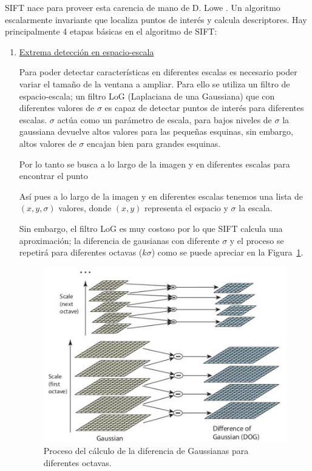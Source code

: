 SIFT nace para proveer esta carencia de mano de D. Lowe \parencite{Reference10}. Un algoritmo escalarmente invariante que  localiza puntos de interés y calcula descriptores. Hay principalmente 4 etapas básicas en el algoritmo de SIFT:

\begin{enumerate}
\item \underline{Extrema detección en espacio-escala}

Para poder detectar características en diferentes escalas es necesario poder variar el tamaño de la ventana a ampliar. Para ello se utiliza un filtro de espacio-escala; un filtro LoG (Laplaciana de una Gaussiana) que con diferentes valores de $\sigma$ es capaz de detectar puntos de interés para diferentes escalas. $\sigma$ actúa como un parámetro de escala, para bajos niveles de $\sigma$ la gaussiana devuelve altos valores para las pequeñas esquinas, sin embargo, altos valores de $\sigma$ encajan bien para grandes esquinas.

Por lo tanto se busca a lo largo de la imagen y en diferentes escalas para encontrar el punto 

Así pues a lo largo de la imagen y en diferentes escalas tenemos una lista de $(x,y,\sigma)$ valores, donde $(x,y)$ representa el espacio y $\sigma$ la escala.

Sin embargo, el filtro LoG es muy costoso por lo que SIFT calcula una aproximación; la diferencia de gausianas con diferente $\sigma$ y el proceso se repetirá para diferentes octavas ($k\sigma$) como se puede apreciar en la Figura~\ref{fig:shif_dog}.

\begin{figure}[ht]
\centering
\includegraphics[scale=0.7]{Figures/sift_dog.jpg}
\decoRule
\caption[Diferencia de gaussianas en SIFT]{Proceso del cálculo de la diferencia de Gaussianas para diferentes octavas.}
\label{fig:shif_dog}
\end{figure}


\end{enumerate}

